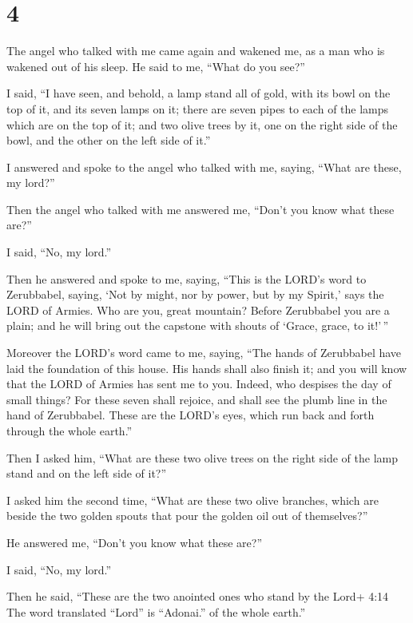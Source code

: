 \hypertarget{section-3}{%
\section{4}\label{section-3}}

 The angel who talked with me came again and wakened me, as
a man who is wakened out of his sleep.  He said to me,
``What do you see?''

I said, ``I have seen, and behold, a lamp stand all of gold, with its
bowl on the top of it, and its seven lamps on it; there are seven pipes
to each of the lamps which are on the top of it;  and two
olive trees by it, one on the right side of the bowl, and the other on
the left side of it.''

 I answered and spoke to the angel who talked with me,
saying, ``What are these, my lord?''

 Then the angel who talked with me answered me, ``Don't you
know what these are?''

I said, ``No, my lord.''

 Then he answered and spoke to me, saying, ``This is the
LORD's word to Zerubbabel, saying, `Not by might, nor by power, but by
my Spirit,' says the LORD of Armies.  Who are you, great
mountain? Before Zerubbabel you are a plain; and he will bring out the
capstone with shouts of `Grace, grace, to it!'\,''

 Moreover the LORD's word came to me, saying, 
``The hands of Zerubbabel have laid the foundation of this house. His
hands shall also finish it; and you will know that the LORD of Armies
has sent me to you.  Indeed, who despises the day of small
things? For these seven shall rejoice, and shall see the plumb line in
the hand of Zerubbabel. These are the LORD's eyes, which run back and
forth through the whole earth.''

 Then I asked him, ``What are these two olive trees on the
right side of the lamp stand and on the left side of it?''

 I asked him the second time, ``What are these two olive
branches, which are beside the two golden spouts that pour the golden
oil out of themselves?''

 He answered me, ``Don't you know what these are?''

I said, ``No, my lord.''

 Then he said, ``These are the two anointed ones who stand
by the Lord+ 4:14 The word translated ``Lord'' is ``Adonai.'' of the
whole earth.''

